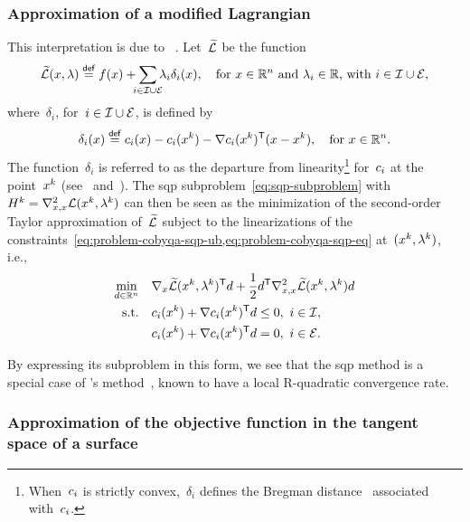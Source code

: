 \subsubsection{Approximation of a modified Lagrangian}

This interpretation is due to \citeauthor{Robinson_1972a}~\cite[Rem.~4]{Robinson_1972a}.
Let~$\widetilde{\lag}$ be the function
\begin{equation*}
    \widetilde{\lag}(\iter, \lm) \eqdef \obj(\iter) + \sum_{\mathclap{i \in \iub \cup \ieq}} \lm_i \delta_i(\iter), \quad \text{for~$\iter \in \R^n$ and~$\lm_i \in \R$, with~$i \in \iub \cup \ieq$},
\end{equation*}
where~$\delta_i$, for~$i \in \mathcal{I} \cup \mathcal{E}$, is defined by
\begin{equation*}
    \delta_i(\iter) \eqdef \con{i}(\iter) - \con{i}(\iter[k]) - \nabla \con{i}(\iter[k])^{\T} (\iter - \iter[k]), \quad \text{for~$\iter \in \R^n$.}
\end{equation*}
The function~$\delta_i$ is referred to as the departure from linearity\footnote{When~$c_{i}$ is strictly convex,~$\delta_i$ defines the Bregman distance~\cite{Bregman_1967} associated with~$c_{i}$.} for~$c_{i}$ at the point~$\iter[k]$ (see~\cite[\S~2]{Gill_Wong_2011} and~\cite[\S~2.3]{Gill_Murray_Saunders_2005}).
The \gls{sqp} subproblem~\cref{eq:sqp-subproblem} with~$H^k = \nabla_{x, x}^2 \lag(\iter[k], \lm[k])$ can then be seen as the minimization of the second-order Taylor approximation of~$\widetilde{\lag}$ subject to the linearizations of the constraints~\cref{eq:problem-cobyqa-sqp-ub,eq:problem-cobyqa-sqp-eq} at~$(\iter[k], \lm[k])$, i.e.,
\begin{align*}
    \min_{\step \in \R^n}   & \quad \nabla_x \widetilde{\lag}(\iter[k], \lm[k])^{\T} \step + \frac{1}{2} \step^{\T} \nabla_{x, x}^2 \widetilde{\lag}(\iter[k], \lm[k]) \step\\
    \text{s.t.}             & \quad \con{i}(\iter[k]) + \nabla \con{i}(\iter[k])^{\T} \step \le 0, ~ i \in \iub,\\
                            & \quad \con{i}(\iter[k]) + \nabla \con{i}(\iter[k])^{\T} \step = 0, ~ i \in \ieq.
\end{align*}

By expressing its subproblem in this form, we see that the \gls{sqp} method is a special case of \citeauthor{Robinson_1972a}'s method~\cite{Robinson_1972a}, known to have a local R-quadratic convergence rate.

\subsubsection{Approximation of the objective function in the tangent space of a surface}

